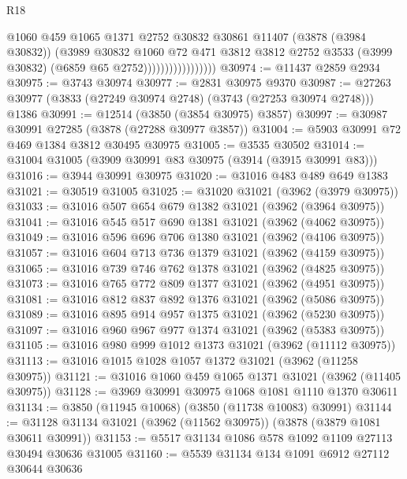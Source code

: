 \begin{lexlean}{R18}
\begin{coremodule}
                                  @1060
                                  @459
                                  @1065
                                  @1371
                                  @2752
                                  @30832
                                  @30861
                                  @11407
                                  (@3878 (@3984 @30832))
                                  (@3989
                                    @30832
                                    @1060
                                    @72
                                    @471
                                    @3812
                                    @3812
                                    @2752
                                    @3533
                                    (@3999 @30832)
                                    (@6859 @65 @2752)))))))))))))))))
@30974 := @11437 @2859 @2934
@30975 := @3743 @30974
@30977 := @2831 @30975 @9370
@30987 := @27263 @30977 (@3833 (@27249 @30974 @2748) (@3743 (@27253 @30974 @2748))) @1386
@30991 := @12514 (@3850 (@3854 @30975) @3857)
@30997 := @30987 @30991 @27285 (@3878 (@27288 @30977 @3857))
@31004 := @5903 @30991 @72 @469 @1384 @3812 @30495 @30975
@31005 := @3535 @30502
@31014 := @31004 @31005 (@3909 @30991 @83 @30975 (@3914 (@3915 @30991 @83)))
@31016 := @3944 @30991 @30975
@31020 := @31016 @483 @489 @649 @1383
@31021 := @30519 @31005
@31025 := @31020 @31021 (@3962 (@3979 @30975))
@31033 := @31016 @507 @654 @679 @1382 @31021 (@3962 (@3964 @30975))
@31041 := @31016 @545 @517 @690 @1381 @31021 (@3962 (@4062 @30975))
@31049 := @31016 @596 @696 @706 @1380 @31021 (@3962 (@4106 @30975))
@31057 := @31016 @604 @713 @736 @1379 @31021 (@3962 (@4159 @30975))
@31065 := @31016 @739 @746 @762 @1378 @31021 (@3962 (@4825 @30975))
@31073 := @31016 @765 @772 @809 @1377 @31021 (@3962 (@4951 @30975))
@31081 := @31016 @812 @837 @892 @1376 @31021 (@3962 (@5086 @30975))
@31089 := @31016 @895 @914 @957 @1375 @31021 (@3962 (@5230 @30975))
@31097 := @31016 @960 @967 @977 @1374 @31021 (@3962 (@5383 @30975))
@31105 := @31016 @980 @999 @1012 @1373 @31021 (@3962 (@11112 @30975))
@31113 := @31016 @1015 @1028 @1057 @1372 @31021 (@3962 (@11258 @30975))
@31121 := @31016 @1060 @459 @1065 @1371 @31021 (@3962 (@11405 @30975))
@31128 := @3969 @30991 @30975 @1068 @1081 @1110 @1370 @30611
@31134 := @3850 (@11945 @10068) (@3850 (@11738 @10083) @30991)
@31144 := @31128 @31134 @31021 (@3962 (@11562 @30975)) (@3878 (@3879 @1081 @30611 @30991))
@31153 := @5517 @31134 @1086 @578 @1092 @1109 @27113 @30494 @30636 @31005
@31160 := @5539 @31134 @134 @1091 @6912 @27112 @30644 @30636

\end{coremodule}
\end{lexlean}
